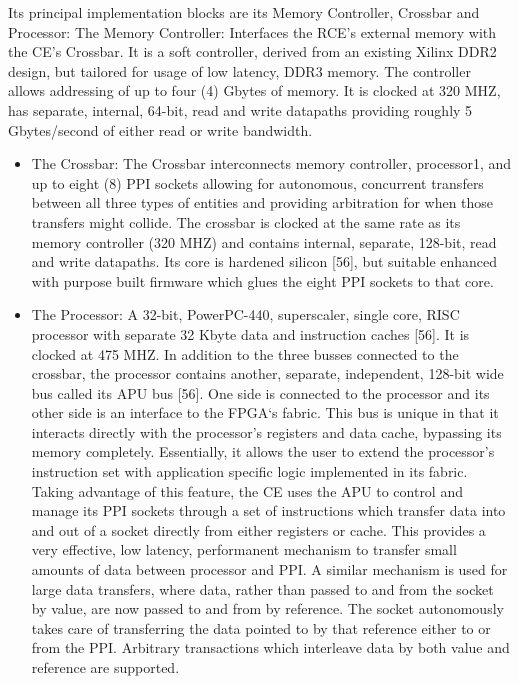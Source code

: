 Its principal implementation blocks are its Memory Controller, Crossbar and Processor:
The Memory Controller: Interfaces the RCE's external memory with the CE's Crossbar. It is a soft controller, derived from an existing Xilinx DDR2 design, but tailored for usage of low latency, DDR3 memory. The controller allows addressing of up to four (4) Gbytes of memory. It is clocked at 320 MHZ, has separate, internal, 64-bit, read and write datapaths providing roughly 5 Gbytes/second of either read or write bandwidth.
\begin{itemize}
\item The Crossbar: The Crossbar interconnects memory controller, processor1, and up to eight (8) PPI sockets allowing for autonomous, concurrent transfers between all three types of entities and providing arbitration for when those transfers might collide. The crossbar is clocked at the same rate as its memory controller (320 MHZ) and contains internal, separate, 128-bit, read and write datapaths. Its core is hardened silicon [56], but suitable enhanced with purpose built firmware which glues the eight PPI sockets to that core.
\item The Processor: A 32-bit, PowerPC-440, superscaler, single core, RISC processor with separate 32 Kbyte data and instruction caches [56]. It is clocked at 475 MHZ. In addition to the three busses connected to the crossbar, the processor contains another, separate, independent, 128-bit wide bus called its APU bus [56]. One side is connected to the processor and its other side is an interface to the FPGA‘s fabric. This bus is unique in that it interacts directly with the processor's registers and data cache, bypassing its memory completely. Essentially, it allows the user to extend the processor's instruction set with application specific logic implemented in its fabric. Taking advantage of this feature, the CE uses the APU to control and manage its PPI sockets through a set of instructions which transfer data into and out of a socket directly from either registers or cache. This provides a very effective, low latency, performanent mechanism to transfer small amounts of data between processor and PPI. A similar mechanism is used for large data transfers, where data, rather than passed to and from the socket by value, are now passed to and from by reference. The socket autonomously takes care of transferring the data pointed to by that reference either to or from the PPI. Arbitrary transactions which interleave data by both value and reference are supported.
\end{itemize}

